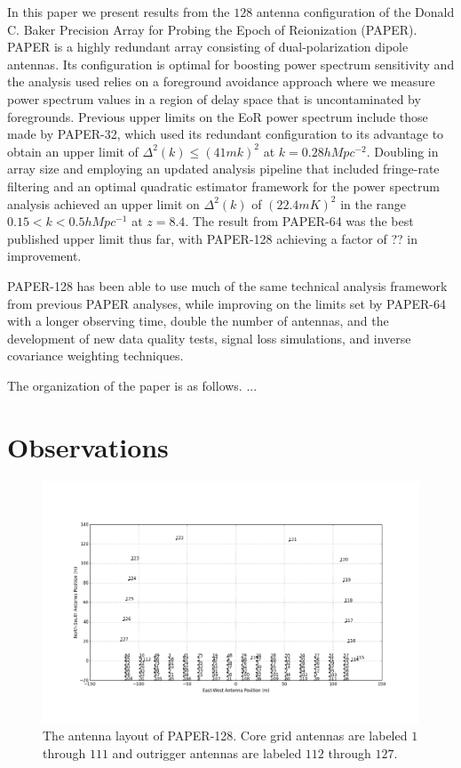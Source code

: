 \documentclass[preprint2,numberedappendix,tighten,twocolappendix]{aastex6}  %
\begin{document}
In this paper we present results from the $128$ antenna configuration of the Donald C. Baker Precision Array for Probing the Epoch of Reionization (PAPER). PAPER is a highly redundant array consisting of dual-polarization dipole antennas. Its configuration is optimal for boosting power spectrum sensitivity and the analysis used relies on a foreground avoidance approach where we measure power spectrum values in a region of delay space that is uncontaminated by foregrounds. Previous upper limits on the EoR power spectrum include those made by PAPER-32, which used its redundant configuration to its advantage to obtain an upper limit of $\Delta^{2}(k) \leq (41 mk)^{2}$ at $k=0.28h Mpc^{-2}$. Doubling in array size and employing an updated analysis pipeline that included fringe-rate filtering and an optimal quadratic estimator framework for the power spectrum analysis achieved an upper limit on $\Delta^{2}(k)$ of $(22.4 mK)^{2}$ in the range $0.15 < k < 0.5h Mpc^{-1}$ at $z = 8.4$. The result from PAPER-64 was the best published upper limit thus far, with PAPER-128 achieving a factor of ?? in improvement.

PAPER-128 has been able to use much of the same technical analysis framework from previous PAPER analyses, while improving on the limits set by PAPER-64 with a longer observing time, double the number of antennas, and the development of new data quality tests, signal loss simulations, and inverse covariance weighting techniques. 

The organization of the paper is as follows. ...

\section{Observations}
\label{sec:Obs}

\begin{figure}[!]
	\centering
	\includegraphics[width=1.0\textwidth]{antlayout.png}
	\caption{The antenna layout of PAPER-128. Core grid antennas are labeled $1$ through $111$ and outrigger antennas are labeled $112$ through $127$.}
	\label{fig:layout}
\end{figure}
\end{document}
